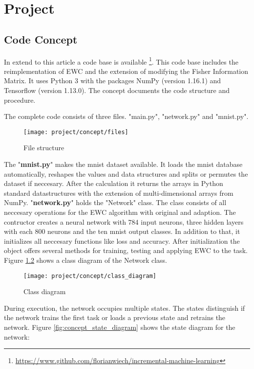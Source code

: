 \chapter{Project}

\section{Code Concept}

In extend to this article a code base is available \footnote{\url{https://www.github.com/florianwiech/incremental-machine-learning}}.
This code base includes the reimplementation of EWC and the extension of modifying the Fisher Information Matrix.
It uses Python 3 with the packages NumPy (version 1.16.1) and Tensorflow (version 1.13.0).
The concept documents the code structure and procedure.

The complete code consists of three files.
"main.py", "network.py" and "mnist.py".

\begin{figure}[H]
    \centering
    \texttt{[image: project/concept/files]}
    \caption{File structure}
    \label{fig:concept_file_structure}
\end{figure}

The "\textbf{mnist.py}" makes the mnist dataset available.
It loads the mnist database automatically, reshapes the values and data structures and splits or permutes the dataset if neccesary.
After the calculation it returns the arrays in Python standard datastructures with the extension of multi-dimensional arrays from NumPy.
\newline
"\textbf{network.py}" holds the "Network" class.
The class consists of all neccesary operations for the EWC algorithm with original and adaption.
The contructor creates a neural network with 784 input neurons, three hidden layers with each 800 neurons and the ten mnist output classes.
In addition to that, it initializes all neccesary functions like loss and accuracy.
After initialization the object offers several methods for training, testing and applying EWC to the task.
Figure \ref{fig:concept_class_diagram} shows a class diagram of the Network class.

\begin{figure}[H]
    \centering
    \texttt{[image: project/concept/class\_diagram]}
    \caption{Class diagram}
    \label{fig:concept_class_diagram}
\end{figure}

During execution, the network occupies multiple states.
The states distinguish if the network trains the first task or loads a previous state and retrains the network.
Figure \ref{fig:concept_state_diagram} shows the state diagram for the network:

